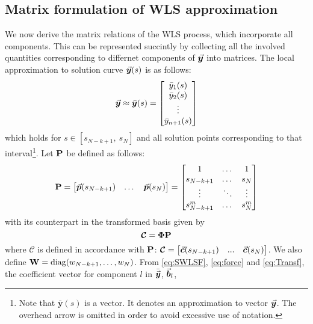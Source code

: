 \subsection{Matrix formulation of WLS approximation}\label{CH5-S2SS1}

We now
derive the matrix relations of the WLS process, which incorporate all 
components. This can be represented succintly by collecting all the involved 
quantities corresponding to differnet components of $\vec{\bm{y}}$ into matrices. 
The local approximation to solution curve $\vec{\bm{y}}(s)$ is as follows:
\begin{equation*}
	\vec{\bm{y}}\approx \bar{\bm{y}}(s)=\begin{bmatrix}
		\bar{y}_1(s)\\ \bar{y}_2(s)\\ \vdots \\ \bar{y}_{n+1}(s)
	\end{bmatrix}
\end{equation*}
which holds for $s\in[s_{N-k+1},\ s_N]$ and all solution points 
corresponding to that interval\footnote{Note that $\bar{\bm{y}}(s)$ is a 
vector. 
It denotes an approximation to vector $\vec{\bm{y}}$. The overhead arrow is omitted 
in order to avoid excessive use of notation.}. Let $\mathbf{P}$ be defined as 
follows:
\begin{equation}
	\mathbf{P}=\begin{bmatrix}
		\vec{\bm{p}}(s_{N-k+1}) & \dots & \vec{\bm{p}}(s_N)
	\end{bmatrix}=\begin{bmatrix}
		1 &  \dots & 1\\
		s_{N-k+1} & \dots & s_N\\
		\vdots & \ddots & \vdots\\
		s_{N-k+1}^m & \dots & s_N^m
	\end{bmatrix}
	\label{eq:P}
\end{equation}
with its counterpart  in the transformed basis given by
\begin{equation}
	\bm{\mathcal{C}}=\mathbf{\Phi}\mathbf{P}
	\label{eq:TransMat}
\end{equation}
where $\bm{\mathcal{C}}$ is defined in accordance with $\mathbf{P}$: 
$\bm{\mathcal{C}}= 
\begin{bmatrix}
	\vec{\bm{c}}(s_{N-k+1}) & ... & \vec{\bm{c}}(s_N)
\end{bmatrix}$. We also define $\mathbf{W}=\text{diag}(w_{N-k+1},\dots,w_N)$. From
\ref{eq:SWLSF}, \ref{eq:force} and \ref{eq:Transf}, the coefficient vector
for component $l$ in $\bar{\vec{\bm{y}}}$, $\vec{\bm{b}}_l$, 
